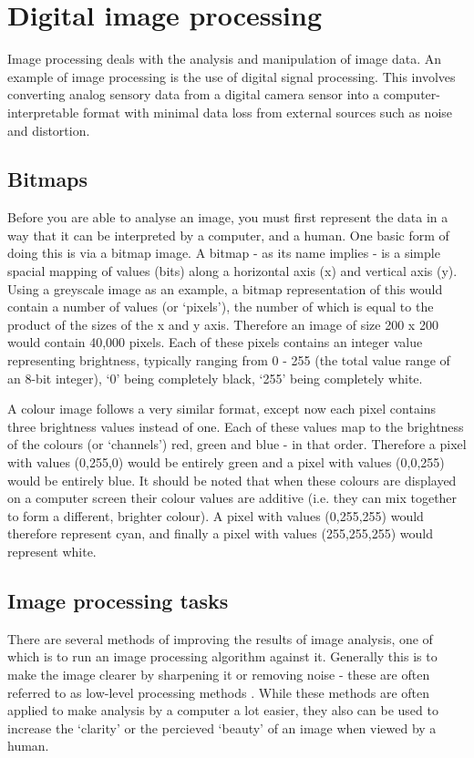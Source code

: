 \documentclass[a4paper,12pt]{report}
\begin{document}
  \section{Digital image processing}
   Image processing deals with the analysis and manipulation of image data. An example of image processing is the use of digital signal processing. This involves converting analog sensory data from a digital camera sensor into a computer-interpretable format with minimal data loss from external sources such as noise and distortion.\\

   \subsection{Bitmaps}
     Before you are able to analyse an image, you must first represent the data in a way that it can be interpreted by a computer, and a human. One basic form of doing this is via a bitmap image. A bitmap - as its name implies - is a simple spacial mapping of values (bits) along a horizontal axis (x) and vertical axis (y). Using a greyscale image as an example, a bitmap representation of this would contain a number of values (or ‘pixels’), the number of which is equal to the product of the sizes of the x and y axis. Therefore an image of size 200 x 200 would contain 40,000 pixels. Each of these pixels contains an integer value representing brightness, typically ranging from 0 - 255 (the total value range of an 8-bit integer), ‘0’ being completely black, ‘255’ being completely white.

     A colour image follows a very similar format, except now each pixel contains three brightness values instead of one. Each of these values map to the brightness of the colours (or ‘channels’) red, green and blue - in that order. Therefore a pixel with values (0,255,0) would be entirely green and a pixel with values (0,0,255) would be entirely blue. It should be noted that when these colours are displayed on a computer screen their colour values are additive (i.e. they can mix together to form a different, brighter colour). A pixel with values (0,255,255) would therefore represent cyan, and finally a pixel with values (255,255,255) would represent white.

   \subsection{Image processing tasks}
     There are several methods of improving the results of image analysis, one of which is to run an image processing algorithm against it. Generally this is to make the image clearer by sharpening it or removing noise - these are often referred to as low-level processing methods \citep{sonka2014image}. While these methods are often applied to make analysis by a computer a lot easier, they also can be used to increase the ‘clarity’ or the percieved ‘beauty’ of an image when viewed by a human.
\end{document}
